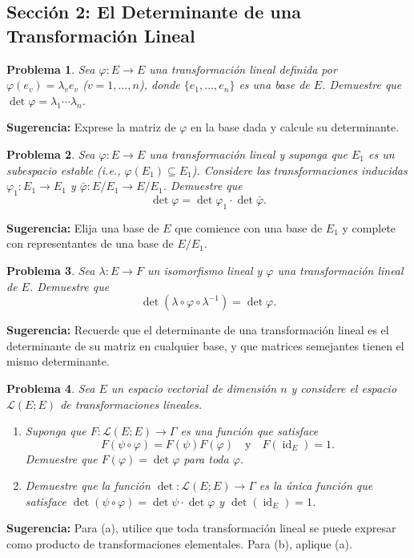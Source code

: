 \documentclass[12pt,a4paper]{article}
\newtheorem{problem}{Problema}
\newenvironment{suggestion}{\par\noindent\textbf{Sugerencia: }}{}
\begin{document}
\subsection{Sección 2: El Determinante de una Transformación Lineal}

\begin{problem}
Sea $\varphi:E\to E$ una transformación lineal definida por $\varphi(e_v)=\lambda_v e_v$ ($v=1,\dots,n$), donde $\{e_1,\dots,e_n\}$ es una base de $E$. Demuestre que $\det\varphi = \lambda_1\cdots\lambda_n$.
\end{problem}
\begin{suggestion}
Exprese la matriz de $\varphi$ en la base dada y calcule su determinante.
\end{suggestion}

\begin{problem}
Sea $\varphi:E\to E$ una transformación lineal y suponga que $E_1$ es un subespacio estable (i.e., $\varphi(E_1)\subseteq E_1$). Considere las transformaciones inducidas $\varphi_1:E_1\to E_1$ y $\bar\varphi:E/E_1\to E/E_1$. Demuestre que
\[
\det\varphi = \det\varphi_1 \cdot \det\bar\varphi.
\]
\end{problem}
\begin{suggestion}
Elija una base de $E$ que comience con una base de $E_1$ y complete con representantes de una base de $E/E_1$.
\end{suggestion}

\begin{problem}
Sea $\lambda:E\to F$ un isomorfismo lineal y $\varphi$ una transformación lineal de $E$. Demuestre que
\[
\det(\lambda\circ\varphi\circ\lambda^{-1}) = \det\varphi.
\]
\end{problem}
\begin{suggestion}
Recuerde que el determinante de una transformación lineal es el determinante de su matriz en cualquier base, y que matrices semejantes tienen el mismo determinante.
\end{suggestion}

\begin{problem}
Sea $E$ un espacio vectorial de dimensión $n$ y considere el espacio $\mathcal{L}(E;E)$ de transformaciones lineales.
\begin{enumerate}
\item Suponga que $F:\mathcal{L}(E;E)\to\Gamma$ es una función que satisface
\[
F(\psi\circ\varphi) = F(\psi)F(\varphi) \quad \text{y} \quad F(\operatorname{id}_E)=1.
\]
Demuestre que $F(\varphi)=\det\varphi$ para toda $\varphi$.
\item Demuestre que la función $\det:\mathcal{L}(E;E)\to\Gamma$ es la única función que satisface $\det(\psi\circ\varphi)=\det\psi\cdot\det\varphi$ y $\det(\operatorname{id}_E)=1$.
\end{enumerate}
\end{problem}
\begin{suggestion}
Para (a), utilice que toda transformación lineal se puede expresar como producto de transformaciones elementales. Para (b), aplique (a).
\end{suggestion}
\end{document}
